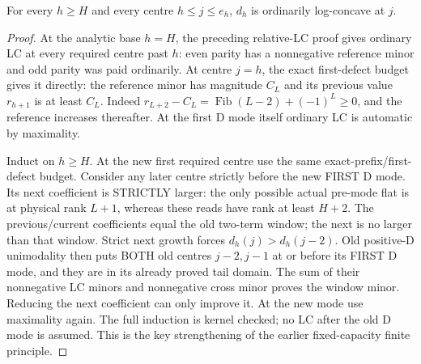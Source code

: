 \begin{lemma}
For every $h\ge H$ and every centre $h\le j\le e_h$, $d_h$
is ordinarily log-concave at $j$.
\end{lemma}
\begin{proof}
At the analytic base $h=H$, the preceding relative-LC proof gives
ordinary LC at every required centre past $h$: even parity has a
nonnegative reference minor and odd parity was paid ordinarily.
At centre $j=h$, the exact first-defect budget gives it directly:
the reference minor has magnitude $C_L$ and its previous value
$r_{h+1}$ is at least $C_L$.
Indeed $r_{L+2}-C_L=\operatorname{Fib}(L-2)+(-1)^L\ge0$,
and the reference increases thereafter.
At the first D mode itself ordinary LC is automatic by maximality.

Induct on $h\ge H$.  At the new first required centre use the
same exact-prefix/first-defect budget.  Consider any later centre
strictly before the new FIRST D mode.  Its next coefficient is
STRICTLY larger: the only possible actual pre-mode flat is at
physical rank $L+1$, whereas these reads have rank at least $H+2$.
The previous/current coefficients equal the old two-term window;
the next is no larger than that window.  Strict next growth forces
$d_h(j)>d_h(j-2)$.  Old positive-D unimodality then puts BOTH
old centres $j-2,j-1$ at or before its FIRST D mode, and they
are in its already proved tail domain.
The sum of their nonnegative LC minors and nonnegative cross minor
proves the window minor.  Reducing the next coefficient can only
improve it.  At the new mode use maximality again.
The full induction is kernel checked; no LC after the old D mode
is assumed.  This is the key strengthening of the earlier
fixed-capacity finite principle.
\end{proof}

